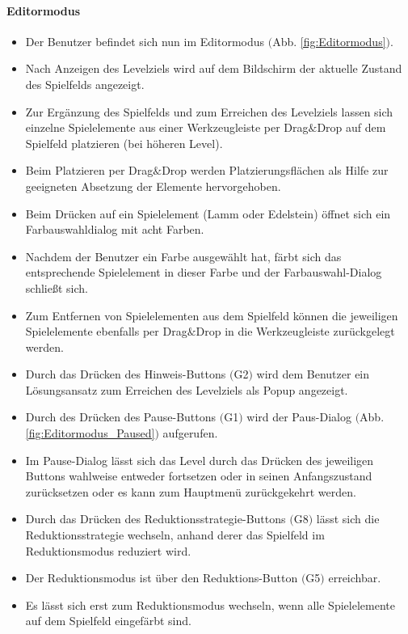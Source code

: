 \paragraph{Editormodus}
\begin{itemize}
\item Der Benutzer befindet sich nun im Editormodus $($Abb. \ref{fig:Editormodus}$)$.
	\item Nach Anzeigen des Levelziels wird auf dem Bildschirm der aktuelle Zustand des Spielfelds angezeigt.
	\item Zur Ergänzung des Spielfelds und zum Erreichen des Levelziels lassen sich einzelne Spielelemente aus einer Werkzeugleiste per Drag$\&$Drop auf dem Spielfeld platzieren (bei höheren Level).
	\item Beim Platzieren per Drag$\&$Drop werden Platzierungsflächen als Hilfe zur geeigneten Absetzung der Elemente hervorgehoben.
	\item Beim Drücken auf ein Spielelement (Lamm oder Edelstein) öffnet sich ein Farbauswahldialog mit acht Farben.
	\item Nachdem der Benutzer ein Farbe ausgewählt hat, färbt sich das entsprechende Spielelement in dieser Farbe und der Farbauswahl-Dialog schließt sich.
	\item Zum Entfernen von Spielelementen aus dem Spielfeld können die jeweiligen Spielelemente ebenfalls per Drag$\&$Drop in die Werkzeugleiste zurückgelegt werden.
	\item Durch das Drücken des Hinweis-Buttons $($G2$)$ wird dem Benutzer ein Lösungsansatz zum Erreichen des Levelziels als Popup angezeigt.
	\item Durch des Drücken des Pause-Buttons $($G1$)$ wird der Paus-Dialog $($Abb. \ref{fig:Editormodus_Paused}$)$ aufgerufen.
	\item Im Pause-Dialog lässt sich das Level durch das Drücken des jeweiligen Buttons wahlweise entweder fortsetzen oder in seinen Anfangszustand zurücksetzen oder es kann zum Hauptmenü zurückgekehrt werden.
	\item Durch das Drücken des Reduktionsstrategie-Buttons $($G8$)$ lässt sich die Reduktionsstrategie wechseln, anhand derer das Spielfeld im Reduktionsmodus reduziert wird.
	\item Der Reduktionsmodus ist über den Reduktions-Button $($G5$)$ erreichbar. 
	\item Es lässt sich erst zum Reduktionsmodus wechseln, wenn alle Spielelemente auf dem Spielfeld eingefärbt sind.
\end{itemize}

